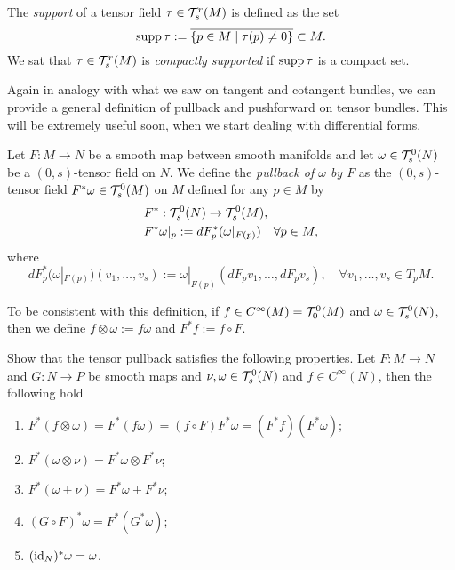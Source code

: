 \begin{definition}
  The \emph{support} of a tensor field $\tau\in\mathcal{T}_s^r(M)$ is defined as the set
  \begin{equation}
    \operatorname{supp} \tau := \overline{\{p\in M\mid \tau(p) \neq 0\}} \subset M.
  \end{equation}
  We sat that $\tau\in\mathcal{T}_s^r(M)$ is \emph{compactly supported} if $\operatorname{supp}\tau$ is a compact set.
\end{definition}

Again in analogy with what we saw on tangent and cotangent bundles, we can provide a general definition of pullback and pushforward on tensor bundles.
This will be extremely useful soon, when we start dealing with differential forms.

\begin{definition}\label{def:pullback0s}
  Let $F:M\to N$ be a smooth map between smooth manifolds and let $\omega \in \mathcal{T}_s^0(N)$ be a $(0,s)$-tensor field on $N$. We define the \emph{pullback of $\omega$ by $F$} as the $(0,s)$-tensor field $F^*\omega \in \mathcal{T}_s^0(M)$ on $M$ defined for any $p\in M$ by
  \begin{align}
     & F^* : \mathcal{T}_s^0(N) \to \mathcal{T}_s^0(M),                             \\
     & F^*\omega|_p := dF^*_p(\omega|_{F(p)}) \quad \forall p\in M,
  \end{align}
  where
  \begin{equation}
    dF^*_p(\omega|_{F(p)})(v_1, \ldots, v_s) := \omega|_{F(p)} (dF_p v_1, \ldots, dF_p v_s), \quad\forall v_1, \ldots, v_s \in T_p M.
  \end{equation}
\end{definition}

To be consistent with this definition, if $f\in C^\infty(M) = \mathcal{T}_0^0(M)$ and $\omega \in\mathcal{T}_s^0(N)$, then we define $f\otimes \omega := f\omega$ and $F^* f := f\circ F$.

\begin{exercise}
  Show that the tensor pullback satisfies the following properties.
  Let $F:M\to N$ and $G:N\to P$ be smooth maps and $\nu, \omega \in\mathcal{T}_s^0(N)$ and $f\in C^\infty(N)$, then the following hold
  \begin{enumerate}
    \item $F^*(f\otimes\omega) = F^*(f \omega) = (f\circ F) F^*\omega = (F^* f)(F^*\omega)$;
    \item $F^*(\omega\otimes\nu) = F^*\omega\otimes F^*\nu$;
    \item $F^*(\omega + \nu) = F^*\omega + F^*\nu$;
    \item $(G\circ F)^*\omega = F^*(G^* \omega)$;
    \item $(\operatorname{id}_N)^* \omega = \omega$.
  \end{enumerate}
\end{exercise}

